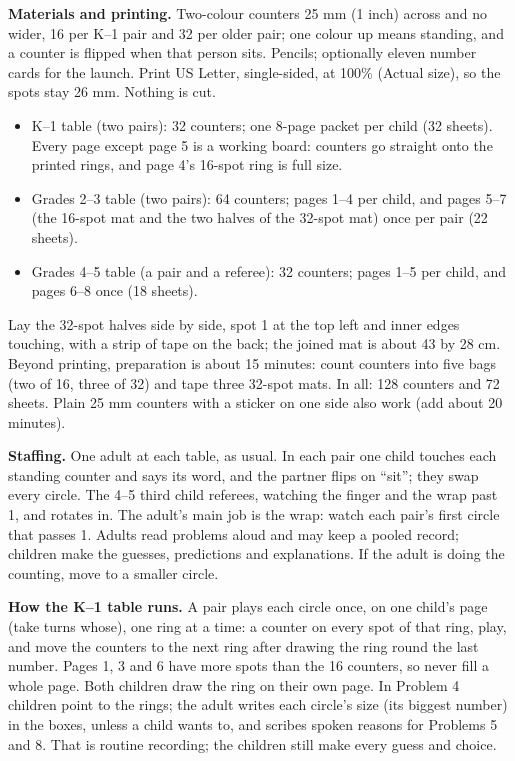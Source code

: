 \documentclass[11pt]{article}
\newcommand{\say}[1]{``#1''}
\begin{document}
\textbf{Materials and printing.} Two-colour counters 25 mm (1 inch) across and no wider, 16 per K--1 pair and 32 per older pair; one colour up means standing, and a counter is flipped when that person sits. Pencils; optionally eleven number cards for the launch. Print US Letter, single-sided, at 100\% (Actual size), so the spots stay 26 mm. Nothing is cut.
\begin{itemize}[nosep,leftmargin=1.2em]
\item K--1 table (two pairs): 32 counters; one 8-page packet per child (32 sheets). Every page except page 5 is a working board: counters go straight onto the printed rings, and page 4's 16-spot ring is full size.
\item Grades 2--3 table (two pairs): 64 counters; pages 1--4 per child, and pages 5--7 (the 16-spot mat and the two halves of the 32-spot mat) once per pair (22 sheets).
\item Grades 4--5 table (a pair and a referee): 32 counters; pages 1--5 per child, and pages 6--8 once (18 sheets).
\end{itemize}
Lay the 32-spot halves side by side, spot 1 at the top left and inner edges touching, with a strip of tape on the back; the joined mat is about 43 by 28 cm. Beyond printing, preparation is about 15 minutes: count counters into five bags (two of 16, three of 32) and tape three 32-spot mats. In all: 128 counters and 72 sheets. Plain 25 mm counters with a sticker on one side also work (add about 20 minutes).

\textbf{Staffing.} One adult at each table, as usual. In each pair one child touches each standing counter and says its word, and the partner flips on \say{sit}; they swap every circle. The 4--5 third child referees, watching the finger and the wrap past 1, and rotates in. The adult's main job is the wrap: watch each pair's first circle that passes 1. Adults read problems aloud and may keep a pooled record; children make the guesses, predictions and explanations. If the adult is doing the counting, move to a smaller circle.

\textbf{How the K--1 table runs.} A pair plays each circle once, on one child's page (take turns whose), one ring at a time: a counter on every spot of that ring, play, and move the counters to the next ring after drawing the ring round the last number. Pages 1, 3 and 6 have more spots than the 16 counters, so never fill a whole page. Both children draw the ring on their own page. In Problem 4 children point to the rings; the adult writes each circle's size (its biggest number) in the boxes, unless a child wants to, and scribes spoken reasons for Problems 5 and 8. That is routine recording; the children still make every guess and choice.
\end{document}
